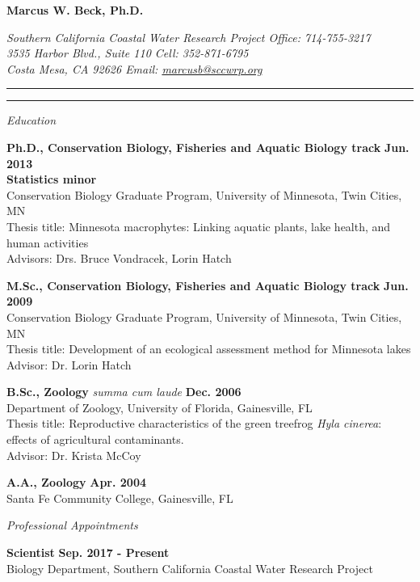 \documentclass[letterpaper,12pt]{article}
\newcommand{\sectitle}[1]{\vspace{\baselineskip} \centerline{\large{\textit{#1}}}}
\begin{document}
\raggedright

\LARGE
\centerline{{\bf Marcus W. Beck, Ph.D.}}
\normalsize
\textit{Southern California Coastal Water Research Project \hfill Office: 714-755-3217 \\
3535 Harbor Blvd., Suite 110 \hfill Cell: 352-871-6795 \\
Costa Mesa, CA 92626 \hfill Email: \href{mailto:marcusb@sccwrp.org}{marcusb@sccwrp.org}}
\vspace{4pt}
\hrule
\vspace{2pt}
\hrule
\vspace{4pt}

\sectitle{Education}

{\bf Ph.D., Conservation Biology, Fisheries and Aquatic Biology track} \hfill {\bf Jun. 2013} \\
{\bf Statistics minor} \\
Conservation Biology Graduate Program, University of Minnesota, Twin Cities, MN \\
Thesis title: Minnesota macrophytes: Linking aquatic plants, lake health, and human activities \\
Advisors: Drs. Bruce Vondracek, Lorin Hatch

{\bf M.Sc., Conservation Biology, Fisheries and Aquatic Biology track} \hfill {\bf Jun. 2009} \\
Conservation Biology Graduate Program, University of Minnesota, Twin Cities, MN \\
Thesis title: Development of an ecological assessment method for Minnesota lakes\\
Advisor: Dr. Lorin Hatch

{\bf B.Sc., Zoology} \textit{summa cum laude} \hfill {\bf Dec. 2006} \\
Department of Zoology, University of Florida, Gainesville, FL \\
Thesis title: Reproductive characteristics of the green treefrog \textit{Hyla cinerea}: effects of agricultural contaminants. \\
Advisor: Dr. Krista McCoy

{\bf A.A., Zoology} \hfill {\bf Apr. 2004} \\
Santa Fe Community College, Gainesville, FL

\sectitle{Professional Appointments}

{\bf Scientist} \hfill {\bf Sep. 2017 - Present}\\
Biology Department, Southern California Coastal Water Research Project
\end{document}
